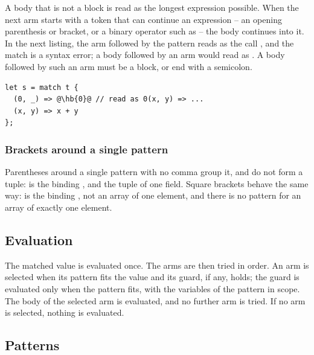 A body that is not a block is read as the longest expression possible. When the
next arm starts with a token that can continue an expression -- an opening
parenthesis or bracket, or a binary operator such as \token{-} -- the body
continues into it. In the next listing, the arm  followed by
the pattern  reads as the call , and the match is a
syntax error; a body  followed by an arm  would
read as . A body followed by such an arm must be a block, or
end with a semicolon.

\begin{lstlisting}[style=coloredverbatimError, escapechar=@]
let s = match t {
  (0, _) => @\hb{0}@ // read as 0(x, y) => ...
  (x, y) => x + y
};
\end{lstlisting}

\subsubsection{Brackets around a single pattern}

Parentheses around a single pattern with no comma group it, and do not form a
tuple:  is the binding , and  the tuple of one
field. Square brackets behave the same way: \token{[x]} is the binding
, not an array of one element, and there is no pattern for an array of
exactly one element.

\subsection{Evaluation}

The matched value is evaluated once. The arms are then tried in order. An arm is
selected when its pattern fits the value and its guard, if any, holds; the guard
is evaluated only when the pattern fits, with the variables of the pattern in
scope. The body of the selected arm is evaluated, and no further arm is tried. If
no arm is selected, nothing is evaluated.

\subsection{Patterns}

